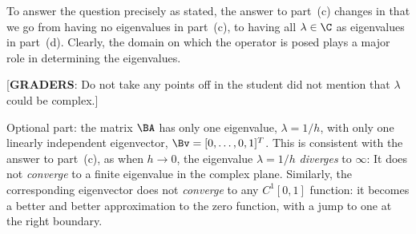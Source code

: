 {\begin{solution}
\begin{enumerate}
      To answer the question precisely as stated, the answer to part~(c) 
      changes in that we go from having no eigenvalues in part~(c), 
      to having all $\lambda\in\C$ as eigenvalues in part~(d).
      Clearly, the domain on which the operator is posed plays a major
      role in determining the eigenvalues.
      
      [\textbf{GRADERS}: Do not take any points off in the student did not
       mention that $\lambda$ could be complex.] 
\end{enumerate}

Optional part:  the matrix $\BA$ has only one eigenvalue, $\lambda = 1/h$, with
only one linearly independent eigenvector, $\Bv = [0, \ldots, 0, 1]^T$.  
This is consistent with the answer to part~(c), as when $h\to 0$, the eigenvalue
$\lambda = 1/h$ \emph{diverges} to $\infty$:  It does not \emph{converge} to
a finite eigenvalue in the complex plane.  Similarly, the corresponding 
eigenvector does not \emph{converge} to any $C^1[0,1]$ function: it becomes
a better and better approximation to the zero function, with a jump to one
at the right boundary.
\end{solution}}{}

